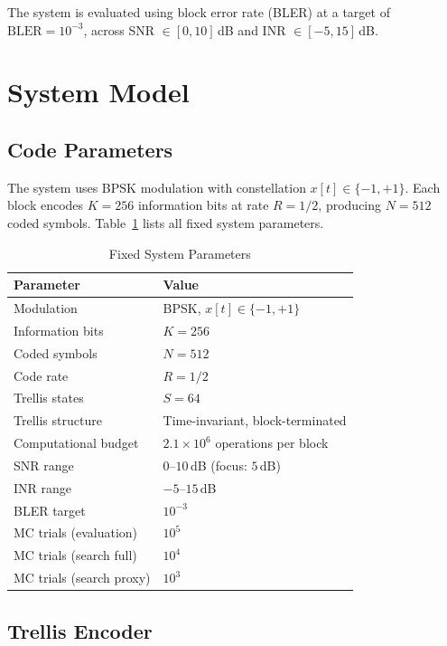 \documentclass[11pt,a4paper]{article}
\newcommand{\bler}{\text{BLER}}
\begin{document}
The system is evaluated using block error rate (BLER) at a target of $\bler = 10^{-3}$, across SNR $\in [0,10]$\,dB and INR $\in [-5, 15]$\,dB.

\section{System Model}

\subsection{Code Parameters}

The system uses BPSK modulation with constellation $x[t] \in \{-1,+1\}$. Each block encodes $K = 256$ information bits at rate $R = 1/2$, producing $N = 512$ coded symbols. Table~\ref{tab:params} lists all fixed system parameters.

\begin{table}[h]
\centering
\caption{Fixed System Parameters}
\label{tab:params}
\begin{tabular}{@{}ll@{}}
\toprule
\textbf{Parameter} & \textbf{Value} \\
\midrule
Modulation              & BPSK, $x[t] \in \{-1,+1\}$ \\
Information bits        & $K = 256$ \\
Coded symbols           & $N = 512$ \\
Code rate               & $R = 1/2$ \\
Trellis states          & $S = 64$ \\
Trellis structure       & Time-invariant, block-terminated \\
Computational budget    & $2.1 \times 10^6$ operations per block \\
SNR range               & $0$--$10$\,dB (focus: $5$\,dB) \\
INR range               & $-5$--$15$\,dB \\
BLER target             & $10^{-3}$ \\
MC trials (evaluation)  & $10^5$ \\
MC trials (search full) & $10^4$ \\
MC trials (search proxy)& $10^3$ \\
\bottomrule
\end{tabular}
\end{table}

\subsection{Trellis Encoder}
\end{document}
